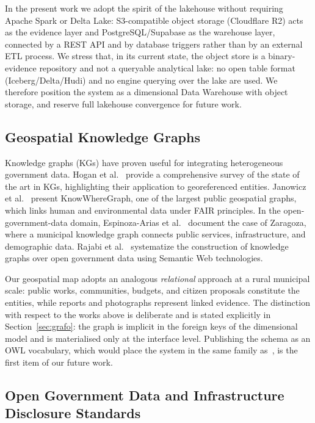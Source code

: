 \documentclass[runningheads]{llncs}
\renewcommand{\_}{\origunderscore\allowbreak}
\begin{document}
In the present work we adopt the spirit of the lakehouse without requiring Apache Spark or Delta Lake: S3-compatible object storage (Cloudflare R2) acts as the evidence layer and PostgreSQL/Supabase as the warehouse layer, connected by a REST API and by database triggers rather than by an external ETL process. We stress that, in its current state, the object store is a binary-evidence repository and not a queryable analytical lake: no open table format (Iceberg/Delta/Hudi) and no engine querying over the lake are used. We therefore position the system as a dimensional Data Warehouse with object storage, and reserve full lakehouse convergence for future work.

\subsection{Geospatial Knowledge Graphs}

Knowledge graphs (KGs) have proven useful for integrating heterogeneous government data. Hogan et al.~\cite{Hogan2021} provide a comprehensive survey of the state of the art in KGs, highlighting their application to georeferenced entities. Janowicz et al.~\cite{Janowicz2022} present KnowWhereGraph, one of the largest public geospatial graphs, which links human and environmental data under FAIR principles. In the open-government-data domain, Espinoza-Arias et al.~\cite{Poveda2020} document the case of Zaragoza, where a municipal knowledge graph connects public services, infrastructure, and demographic data. Rajabi et al.~\cite{Rajabi2023} systematize the construction of knowledge graphs over open government data using Semantic Web technologies.

Our geospatial map adopts an analogous \emph{relational} approach at a rural municipal scale: public works, communities, budgets, and citizen proposals constitute the entities, while reports and photographs represent linked evidence. The distinction with respect to the works above is deliberate and is stated explicitly in Section~\ref{sec:grafo}: the graph is implicit in the foreign keys of the dimensional model and is materialised only at the interface level. Publishing the schema as an OWL vocabulary, which would place the system in the same family as~\cite{Janowicz2022,Poveda2020,Rajabi2023}, is the first item of our future work.

\subsection{Open Government Data and Infrastructure Disclosure Standards}
\end{document}
